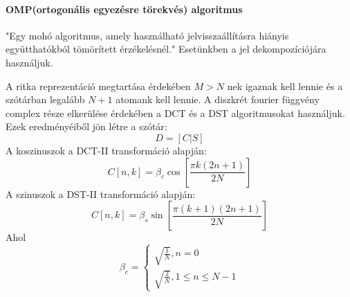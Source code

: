 \paragraph*{OMP(ortogonális egyezésre törekvés) algoritmus}
"Egy mohó algoritmus, amely használható jelvisszaállításra hiányis együtthatókból tömörített érzékelésnél."\cite{noise_reduction_omp} Esetünkben a jel dekompozíciójára használjuk.

A ritka reprezentáció megtartása érdekében $M > N$ nek igaznak kell lennie és a szótárban legalább $N + 1$ atomank kell lennie.
A diszkrét fourier függvény complex része elkerülése érdekében a DCT és a DST algoritmusokat használjuk. Ezek eredményéiből jön létre a szótár: \[D = [C|S]\]
A koszinuszok a DCT-II transformáció alapján: \[C[n, k] = \beta_c \cos[\frac{\pi k (2n + 1)}{2N}]\]
A szinuszok a DST-II transformáció alapján: \[C[n, k] = \beta_s \sin[\frac{\pi (k + 1) (2n + 1)}{2N}]\]
Ahol 
\begin{equation}
    \beta_c =
    \begin{cases}
        \sqrt{\frac{1}{N}}, n = 0\\
        \sqrt{\frac{2}{N}}, 1 \leq n \leq N - 1
    \end{cases}
\end{equation}
